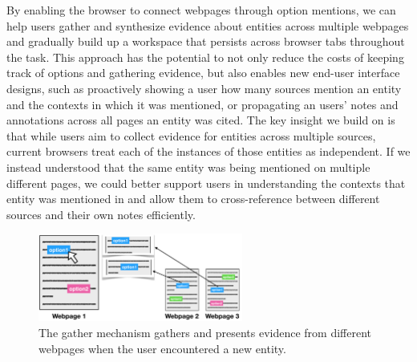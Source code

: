 By enabling the browser to connect webpages through option mentions, we can help users gather and synthesize evidence about entities across multiple webpages and gradually build up a workspace that persists across browser tabs throughout the task. This approach has the potential to not only reduce the costs of keeping track of options and gathering evidence, but also enables new end-user interface designs, such as proactively showing a user how many sources mention an entity and the contexts in which it was mentioned, or propagating an users' notes and annotations across all pages an entity was cited.
The key insight we build on is that while users aim to collect evidence for entities across multiple sources, current browsers treat each of the instances of those entities as independent. If we instead understood that the same entity was being mentioned on multiple different pages, we could better support users in understanding the contexts that entity was mentioned in and allow them to cross-reference between different sources and their own notes efficiently.


%


\begin{figure}
    \centering
    \includegraphics[width=0.6\textwidth]{images/gather.png}
    \caption{The gather mechanism gathers and presents evidence from different webpages when the user encountered a new entity.}
    \label{fig:gather}
\end{figure}



